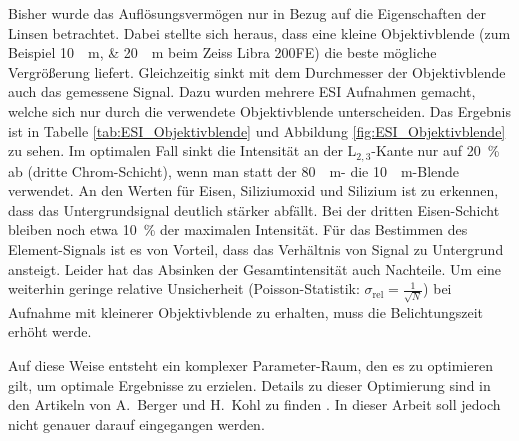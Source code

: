 \documentclass[
	paper=a4,				%
	twoside=true,			%
	BCOR=6mm,				%
	fontsize=12pt,			%
	pagesize=auto,			%
	numbers=noenddot,		%
	bibliography=totoc,		%
	draft=false
]{scrartcl}
\begin{document}
Bisher wurde das Auflösungsvermögen nur in Bezug auf die Eigenschaften der Linsen betrachtet. Dabei stellte sich heraus, dass eine kleine Objektivblende (zum Beispiel \SIlist{10;20}{\mu\meter} beim Zeiss Libra 200FE) die beste mögliche Vergrößerung liefert. Gleichzeitig sinkt mit dem Durchmesser der Objektivblende auch das gemessene Signal. Dazu wurden mehrere ESI Aufnahmen gemacht, welche sich nur durch die verwendete Objektivblende unterscheiden. Das Ergebnis ist in Tabelle \ref{tab:ESI_Objektivblende} und Abbildung \ref{fig:ESI_Objektivblende} zu sehen. Im optimalen Fall sinkt die Intensität an der L$_{2,3}$-Kante nur auf \SI{20}{\percent} ab (dritte Chrom-Schicht), wenn man statt der \SI{80}{\mu\meter}- die \SI{10}{\mu\meter}-Blende verwendet. An den Werten für Eisen, Siliziumoxid und Silizium ist zu erkennen, dass das Untergrundsignal deutlich stärker abfällt. Bei der dritten Eisen-Schicht bleiben noch etwa \SI{10}{\percent} der maximalen Intensität. Für das Bestimmen des Element-Signals ist es von Vorteil, dass das Verhältnis von Signal zu Untergrund ansteigt. Leider hat das Absinken der Gesamtintensität auch Nachteile. Um eine weiterhin geringe relative Unsicherheit (Poisson-Statistik: $\sigma_\mathrm{rel}=\frac{1}{\sqrt{N}}$) bei Aufnahme mit kleinerer Objektivblende zu erhalten, muss die Belichtungszeit erhöht werde.

Auf diese Weise entsteht ein komplexer Parameter-Raum, den es zu optimieren gilt, um optimale Ergebnisse zu erzielen. Details zu dieser Optimierung sind in den Artikeln von A.\ Berger und H.\ Kohl zu finden \cite{berger_optimum_1993,berger_detection_1994,kohl_resolution_1995}. In dieser Arbeit soll jedoch nicht genauer darauf eingegangen werden.

\clearpage



\end{document}
